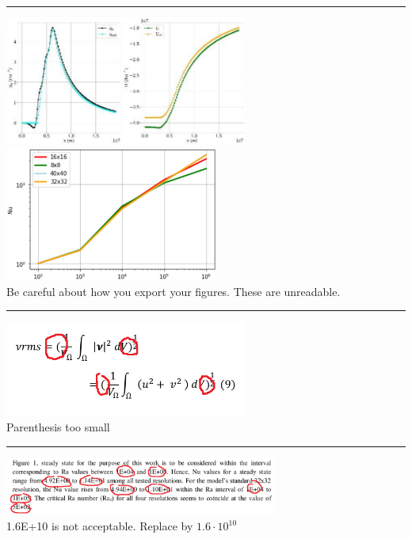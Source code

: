 \par\noindent\rule{\textwidth}{0.4pt}
\begin{center}
\includegraphics[width=8cm]{images/grading/pixels1}
\includegraphics[width=7cm]{images/grading/pixels2}\\
Be careful about how you export your figures. These are unreadable.
\end{center}
 
\par\noindent\rule{\textwidth}{0.4pt}
\begin{center}
\includegraphics[width=8cm]{images/grading/eqs1}\\
Parenthesis too small
\end{center}

\par\noindent\rule{\textwidth}{0.4pt}
\begin{center}
\includegraphics[width=9cm]{images/grading/eqs2}\\
1.6E+10 is not acceptable. Replace by $1.6\cdot 10^{10}$
\end{center}

